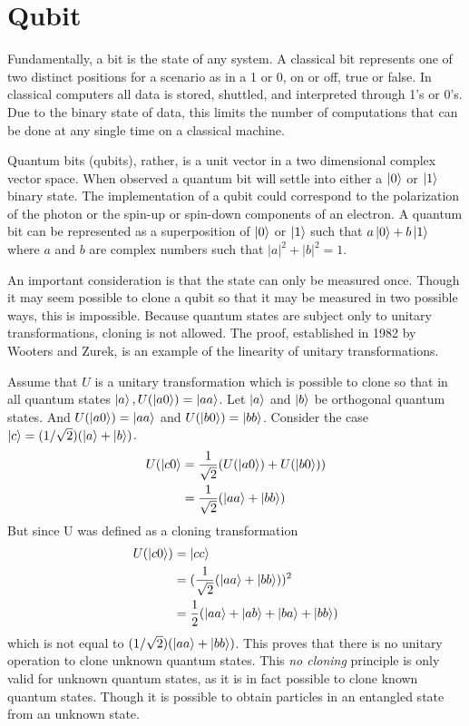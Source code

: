 \documentclass[12pt]{article}
\begin{document}
\section{Qubit}
Fundamentally, a bit is the state of any system. A classical bit represents one of two distinct positions for a scenario as in a 1 or 0, on or off, true or false. In classical computers all data is stored, shuttled, and interpreted through 1's or 0's. Due to the binary state of data, this limits the number of computations that can be done at any single time on a classical machine.\par
Quantum bits (qubits), rather, is a unit vector in a two dimensional complex vector space. When observed a quantum bit will settle into either a $\ket{0}$ or $\ket{1}$ binary state. The implementation of a qubit could correspond to the polarization of the photon or the spin-up or spin-down components of an electron.\cite{non} A quantum bit can be represented as a superposition of $\ket{0}$ or $\ket{1}$ such that $a\ket{0}+b\ket{1}$ where $a$ and $b$ are complex numbers such that $\left| a\right |^2+\left| b\right| ^2 = 1$.\par
An important consideration is that the state can only be measured once. Though it may seem possible to clone a qubit so that it may be measured in two possible ways, this is impossible. Because quantum states are subject only to unitary transformations, cloning is not allowed. The proof, established in 1982 by Wooters and Zurek, is an example of the linearity of unitary transformations.\cite{non}\par
Assume that $U$ is a unitary transformation which is possible to clone so that in all quantum states $\ket{a}, U(\ket{a0}) = \ket{aa}$. Let $\ket{a}$ and $\ket{b}$ be orthogonal quantum states. And $U(\ket{a0}) = \ket{aa}$ and $U(\ket{b0}) = \ket{bb}$. Consider the case $\ket{c} = (1/\sqrt{2})(\ket{a} + \ket{b})$.
\begin{align*}
U(\ket{c0} &= \frac{1}{\sqrt{2}}(U(\ket{a0})+U(\ket{b0}))\\
&= \frac{1}{\sqrt{2}}(\ket{aa}+\ket{bb})
\end{align*}
But since U was defined as a cloning transformation
\begin{align*}
U(\ket{c0}) &= \ket{cc}\\
&= (\frac{1}{\sqrt{2}}(\ket{aa}+\ket{bb}))^2\\
&= \frac{1}{2}(\ket{aa}+\ket{ab}+\ket{ba}+\ket{bb})
\end{align*}
which is not equal to $(1/\sqrt{2})(\ket{aa}+\ket{bb})$. This proves that there is no unitary operation to clone unknown quantum states. This \textit{no cloning} principle is only valid for unknown quantum states, as it is in fact possible to clone known quantum states. Though it is possible to obtain particles in an entangled state from an unknown state.
\end{document}
